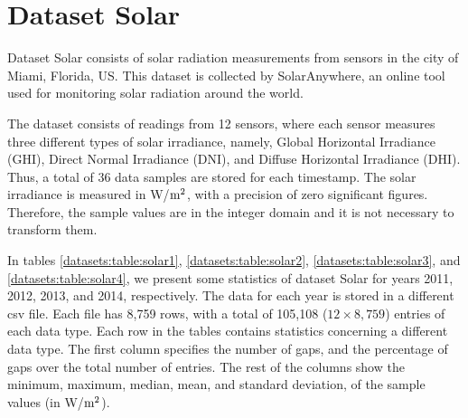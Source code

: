 
\vspace{-10pt}
\section{Dataset Solar}
\label{datasets:solar}
\newcommand{\unitSolar}{W/$\textnormal{m}^2$}

Dataset Solar \cite{dataset:solar} consists of solar radiation measurements from sensors in the city of Miami, Florida, US. This dataset is collected by SolarAnywhere, an online tool used for monitoring solar radiation around the world.


The dataset consists of readings from 12 sensors, where each sensor measures three different types of solar irradiance, namely, Global Horizontal Irradiance (GHI), Direct Normal Irradiance (DNI), and Diffuse Horizontal Irradiance (DHI). Thus, a total of 36 data samples are stored for each timestamp. The solar irradiance is measured in \unitSolar, with a precision of zero significant figures. Therefore, the sample values are in the integer domain and it is not necessary to transform them.


In tables \ref{datasets:table:solar1}, \ref{datasets:table:solar2}, \ref{datasets:table:solar3}, and \ref{datasets:table:solar4}, we present some statistics of dataset Solar for years 2011, 2012, 2013, and 2014, respectively. The data for each year is stored in a different csv file. Each file has 8,759 rows, with a total of 105,108 ($12\times8,759$) entries of each data type. Each row in the tables contains statistics concerning a different data type. The first column specifies the number of gaps, and the percentage of gaps over the total number of entries. The rest of the columns show the minimum, maximum, median, mean, and standard deviation, of the sample values (in \unitSolar).




